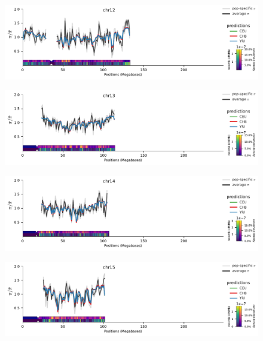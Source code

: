 \documentclass[11pt]{article}
\begin{document}
\begin{figure}[!htb]
  \centering
  \includegraphics[width=\textwidth]{figures/supplementary/pred_plot_chr12.pdf}
  \label{suppfig:fit-chr12}
\end{figure}


\begin{figure}[!htb]
  \centering
  \includegraphics[width=\textwidth]{figures/supplementary/pred_plot_chr13.pdf}
  \label{suppfig:fit-chr13}
\end{figure}


\begin{figure}[!htb]
  \centering
  \includegraphics[width=\textwidth]{figures/supplementary/pred_plot_chr14.pdf}
  \label{suppfig:fit-chr14}
\end{figure}


\begin{figure}[!htb]
  \centering
  \includegraphics[width=\textwidth]{figures/supplementary/pred_plot_chr15.pdf}
  \label{suppfig:fit-chr15}
\end{figure}
\end{document}
